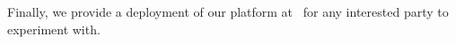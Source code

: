 \documentclass{sig-alternate}
\begin{document}
Finally, we provide a deployment of our platform at~\cite{hive-repo} for any
interested party to experiment with.







\end{document}

